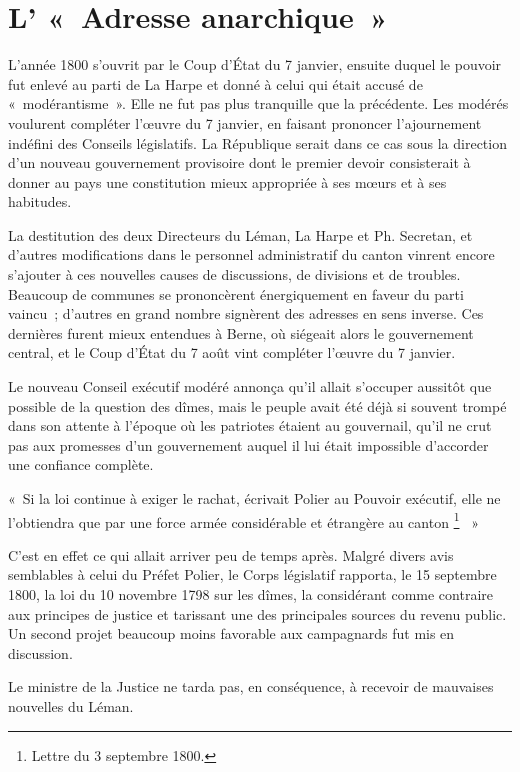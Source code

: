 \documentclass[french,twoside]{book} %
\newenvironment{quoteblock}%
  {\begin{quoting}}
  {\end{quoting}}
\newenvironment{quotebar}{%
    \def\FrameCommand{{\color{rubric!10!}\vrule width 0.5em} \hspace{0.9em}}%
    \def\OuterFrameSep{\itemsep} %
    \MakeFramed {\advance\hsize-\width \FrameRestore}
  }%
  {%
    \endMakeFramed
  }
\renewenvironment{quoteblock}%
  {%
    \savenotes
    \setstretch{0.9}
    \normalfont
    \begin{quotebar}
  }
  {%
    \end{quotebar}
    \spewnotes
  }
\begin{document}
\section[{L’ « Adresse anarchique »}]{L’ « Adresse anarchique »}
\noindent L’année 1800 s’ouvrit par le Coup d’État du 7 janvier, ensuite duquel le pouvoir fut enlevé au parti de La Harpe et donné à celui qui était accusé de « modérantisme ». Elle ne fut pas plus tranquille que la précédente. Les modérés voulurent compléter l’œuvre du 7 janvier, en faisant prononcer l’ajournement indéfini des Conseils législatifs. La République serait dans ce cas sous la direction d’un nouveau gouvernement provisoire dont le premier devoir consisterait à donner au pays une constitution mieux appropriée à ses mœurs et à ses habitudes.\par
La destitution des deux Directeurs du Léman, La Harpe et Ph. Secretan, et d’autres modifications dans le personnel administratif du canton vinrent encore s’ajouter à ces nouvelles causes de discussions, de divisions et de troubles. Beaucoup de communes se prononcèrent énergiquement en faveur du parti vaincu ; d’autres en grand nombre signèrent des adresses en sens inverse. Ces dernières furent mieux entendues à Berne, où siégeait alors le gouvernement central, et le Coup d’État du 7 août vint compléter l’œuvre du 7 janvier.\par
Le nouveau Conseil exécutif modéré annonça qu’il allait s’occuper aussitôt que possible de la question des dîmes, mais le peuple avait été déjà si souvent trompé dans son attente à l’époque où les patriotes étaient au gouvernail, qu’il ne crut pas aux promesses d’un gouvernement auquel il lui était impossible d’accorder une confiance complète.\par

\begin{quoteblock}
 \noindent « Si la loi continue à exiger le rachat, écrivait Polier au Pouvoir exécutif, elle ne l’obtiendra que par une force armée considérable et étrangère au canton \footnote{Lettre du 3 septembre 1800.}  »
 \end{quoteblock}

\noindent C’est en effet ce qui allait arriver peu de temps après. Malgré divers avis semblables à celui du Préfet Polier, le Corps législatif rapporta, le 15 septembre 1800, la loi du 10 novembre 1798 sur les dîmes, la considérant comme contraire aux principes de justice et tarissant une des principales sources du revenu public. Un second projet beaucoup moins favorable aux campagnards fut mis en discussion.\par
Le ministre de la Justice ne tarda pas, en conséquence, à recevoir de mauvaises nouvelles du Léman.\par
\end{document}

